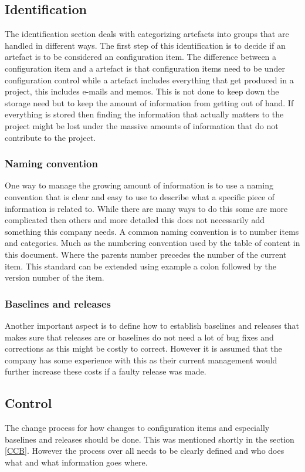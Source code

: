 \documentclass[a4paper]{article}
\begin{document}
\subsection{Identification}
The identification section deals with categorizing artefacts into groups that are handled in different ways. The first step of this identification is to decide if an artefact is to be considered an configuration item. The difference between a configuration item and a artefact is that configuration items need to be under configuration control while a artefact includes everything that get produced in a project, this includes e-mails and memos. This is not done to keep down the storage need but to keep the amount of information from getting out of hand. If everything is stored then finding the information that actually matters to the project might be lost under the massive amounts of information that do not contribute to the project.

\subsubsection{Naming convention}
One way to manage the growing amount of information is to use a naming convention that is clear and easy to use to describe what a specific piece of information is related to. While there are many ways to do this some are more complicated then others and more detailed this does not necessarily add something this company needs. A common naming convention is to number items and categories. Much as the numbering convention used by the table of content in this document. Where the parents number precedes the number of the current item. This standard can be extended using example a colon followed by the version number of the item.

\subsubsection{Baselines and releases}
Another important aspect is to define how to establish baselines and releases that makes sure that releases are or baselines do not need a lot of bug fixes and corrections as this might be costly to correct. However it is assumed that the company has some experience with this as their current management would further increase these costs if a faulty release was made.

\subsection{Control}
The change process for how changes to configuration items and especially baselines and releases should be done. This was mentioned shortly in the section \ref{CCB}. However the process over all needs to be clearly defined and who does what and what information goes where.
\end{document}
